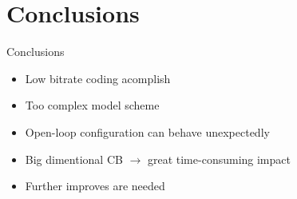 \documentclass[10pt]{beamer}
\begin{document}

  \begingroup
  \section{Conclusions}
  \endgroup

  \begin{frame}{Conclusions}
    \begin{itemize}
      \item Low bitrate coding acomplish
      \item Too complex model scheme
      \item Open-loop configuration can behave unexpectedly
      \item Big dimentional CB $\rightarrow$ great time-consuming impact
      \item Further improves are needed
    \end{itemize}
  \end{frame}





\maketitle
\end{document}
